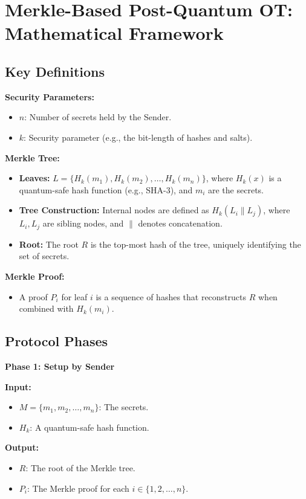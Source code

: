 \section{Merkle-Based Post-Quantum OT: Mathematical Framework}
\subsection{Key Definitions}
\textbf{Security Parameters:}
\begin{itemize}
    \item $n$: Number of secrets held by the Sender.
    \item $k$: Security parameter (e.g., the bit-length of hashes and salts).
\end{itemize}

\textbf{Merkle Tree:}
\begin{itemize}
    \item \textbf{Leaves:} $L = \{ H_k(m_1), H_k(m_2), \dots, H_k(m_n) \}$, where $H_k(x)$ is a quantum-safe hash function (e.g., SHA-3), and $m_i$ are the secrets.
    \item \textbf{Tree Construction:} Internal nodes are defined as $H_k(L_i \parallel L_j)$, where $L_i, L_j$ are sibling nodes, and $\parallel$ denotes concatenation.
    \item \textbf{Root:} The root $R$ is the top-most hash of the tree, uniquely identifying the set of secrets.
\end{itemize}

\textbf{Merkle Proof:}
\begin{itemize}
    \item A proof $P_i$ for leaf $i$ is a sequence of hashes that reconstructs $R$ when combined with $H_k(m_i)$.
\end{itemize}

\subsection{Protocol Phases}
\textbf{Phase 1: Setup by Sender}

\textbf{Input:}
\begin{itemize}
    \item $M = \{ m_1, m_2, \dots, m_n \}$: The secrets.
    \item $H_k$: A quantum-safe hash function.
\end{itemize}

\textbf{Output:}
\begin{itemize}
    \item $R$: The root of the Merkle tree.
    \item $P_i$: The Merkle proof for each $i \in \{ 1, 2, \dots, n \}$.
\end{itemize}

